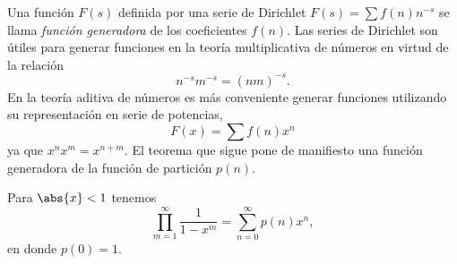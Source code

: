     Una función $F(s)$ definida por una serie de Dirichlet $F(s)=\sum f(n)n^{-s}$ se llama
    \textit{función generadora} de los coeficientes $f(n)$. Las series de Dirichlet son útiles
    para generar funciones en la teoría multiplicativa de números en virtud de la relación
    \begin{equation*}
        n^{-s}m^{-s}=(nm)^{-s}.
    \end{equation*}
    En la teoría aditiva de números es más conveniente generar funciones utilizando su
    representación en serie de potencias,
    \begin{equation*}
        F(x)=\sum f(n)x^n
    \end{equation*}
    ya que $x^nx^m=x^{n+m}$. El teorema que sigue pone de manifiesto una función generadora de
    la función de partición $p(n)$.

    \begin{teorema}[Euler]\label{teo:14-2}
        Para $\abs{x}<1$ tenemos
        \begin{equation*}
            \prod_{m=1}^{\infty}\frac{1}{1-x^m}=\sum_{n=0}^{\infty}p(n)x^n,
        \end{equation*}
        en donde $p(0)=1$.
    \end{teorema}

